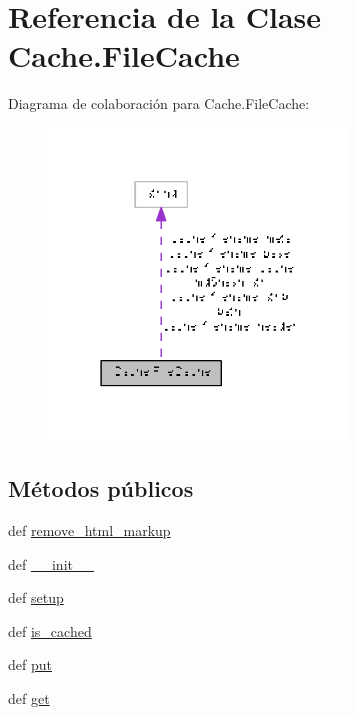 \hypertarget{class_cache_1_1_file_cache}{\section{Referencia de la Clase Cache.\-File\-Cache}
\label{class_cache_1_1_file_cache}
}


Diagrama de colaboración para Cache.\-File\-Cache\-:\nopagebreak
\begin{figure}[H]
\begin{center}
\leavevmode
\includegraphics[width=226pt]{class_cache_1_1_file_cache__coll__graph}
\end{center}
\end{figure}
\subsection*{Métodos públicos}
\begin{DoxyCompactItemize}
\item 
def \hyperlink{class_cache_1_1_file_cache_ac5fa19d6e9b990f58ae6969abfdeceed}{remove\-\_\-html\-\_\-markup}
\item 
def \hyperlink{class_cache_1_1_file_cache_a794781e8000f88b6990d1d1a2b24fbe6}{\-\_\-\-\_\-init\-\_\-\-\_\-}
\item 
def \hyperlink{class_cache_1_1_file_cache_a3a0ff0a693d8eb05c5635ac68c86a65b}{setup}
\item 
def \hyperlink{class_cache_1_1_file_cache_a45b17bfd8c65aa650fd0f53209d03b5c}{is\-\_\-cached}
\item 
def \hyperlink{class_cache_1_1_file_cache_a474cd0cce36603d869add65a52ec852b}{put}
\item 
def \hyperlink{class_cache_1_1_file_cache_a6580598cf60ffda8176dbe4036c4929c}{get}
\end{DoxyCompactItemize}
